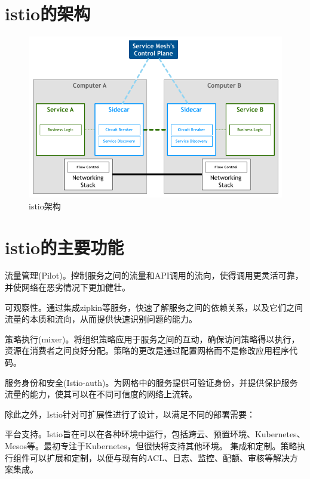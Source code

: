 \documentclass{ctexart}
\begin{document}
\section{istio的架构}
\begin{figure}[H]
\includegraphics[scale=0.6]{istio/framework.png}
\caption{istio架构}
\end{figure}

\section{istio的主要功能}
流量管理(Pilot)。控制服务之间的流量和API调用的流向，使得调用更灵活可靠，并使网络在恶劣情况下更加健壮。

可观察性。通过集成zipkin等服务，快速了解服务之间的依赖关系，以及它们之间流量的本质和流向，从而提供快速识别问题的能力。

策略执行(mixer)。将组织策略应用于服务之间的互动，确保访问策略得以执行，资源在消费者之间良好分配。策略的更改是通过配置网格而不是修改应用程序代码。

服务身份和安全(Istio-auth)。为网格中的服务提供可验证身份，并提供保护服务流量的能力，使其可以在不同可信度的网络上流转。

除此之外，Istio针对可扩展性进行了设计，以满足不同的部署需要：

平台支持。Istio旨在可以在各种环境中运行，包括跨云、预置环境、Kubernetes、Mesos等。最初专注于Kubernetes，但很快将支持其他环境。
集成和定制。策略执行组件可以扩展和定制，以便与现有的ACL、日志、监控、配额、审核等解决方案集成。
\end{document}

